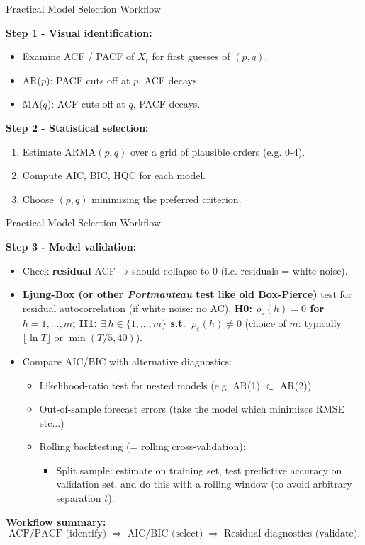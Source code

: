 \documentclass{beamer}
\begin{document}
\begin{frame}{Practical Model Selection Workflow}
\small

\textbf{Step 1 - Visual identification:}
\begin{itemize}
    \item Examine ACF / PACF of $X_t$ for first guesses of $(p,q)$.
    \item AR($p$): PACF cuts off at $p$, ACF decays.  
    \item   MA($q$): ACF cuts off at $q$, PACF decays.
\end{itemize}

\pause
\textbf{Step 2 - Statistical selection:}
\begin{enumerate}
    \item Estimate ARMA$(p,q)$ over a grid of plausible orders (e.g. 0-4).
    \item Compute AIC, BIC, HQC for each model.
    \item Choose $(p,q)$ minimizing the preferred criterion.
\end{enumerate}
\end{frame}


\begin{frame}{Practical Model Selection Workflow}
\small

\textbf{Step 3 - Model validation:}
\begin{itemize}
    \item Check \textbf{residual} ACF → should collapse to 0 (i.e. residuals = white noise).
    \item \textbf{Ljung-Box (or other \textit{Portmanteau} test like old Box-Pierce)} test for residual autocorrelation (if white noise: no AC). \textbf{H0: $\rho_{\varepsilon}(h) = 0$ for $h = 1,\ldots,m$; H1: $\exists\, h \in\{1,\ldots,m\}$ s.t.\ $\rho_{\varepsilon}(h) \neq 0$} (choice of $m$: typically $\lfloor \ln T \rfloor$ or $\min(T/5, 40)$).
    \item Compare AIC/BIC with alternative diagnostics:
      \begin{itemize}
          \item Likelihood-ratio test for nested models (e.g. AR(1) $\subset$ AR(2)).
          \item Out-of-sample forecast errors (take the model which minimizes RMSE etc...)
          \item Rolling backtesting (= rolling cross-validation):
          \begin{itemize}
              \item Split sample: estimate on training set, test predictive accuracy on validation set, and do this with a rolling window (to avoid arbitrary separation $t$).
          \end{itemize}
      \end{itemize}
\end{itemize}

\textbf{Workflow summary:}
\[
\text{ACF/PACF (identify)} 
\;\Rightarrow\;
\text{AIC/BIC (select)} 
\;\Rightarrow\;
\text{Residual diagnostics (validate)}.
\]
\end{frame}
\end{document}
